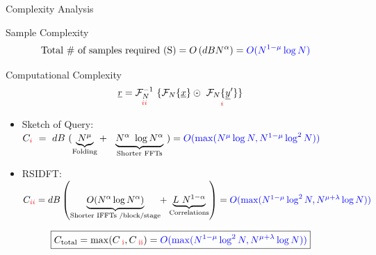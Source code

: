 \documentclass[10pt,xcolor=table]{beamer}
\newcommand{\xv}{\underline{x}}
\newcommand{\yv}{\underline{y}}
\newcommand{\rv}{\underline{r}}
\newcommand{\RNum}[1]{\uppercase\expandafter{\romannumeral #1\relax}}
\begin{document}
\begin{frame}{Complexity Analysis}
	\begin{block}{Sample Complexity}
		\vspace{-10pt}
		\begin{align*}
		\text{Total \# of samples required (S)} &= O \left(dBN^{\alpha}\right) =   {\color{blue}O(N^{1-\mu}\log N)}
		\end{align*}
	\end{block}
	\begin{block}{Computational Complexity}
		\begin{equation*}\label{eqn:Rxy_fourier}
		\rv = \underset{\color{red}  \RNum{2} } {\mathcal{F}_{N}^{-1}} \ \{   \mathcal{F}_{N}\{\xv\}  \odot \ \underset{\color{red}  \RNum{1}  }{ \mathcal{F}_{N}\{\yv'\}}  \}
		\end{equation*}
		\vspace{-10pt}

	\begin{itemize}
		\item {\color{blue}Sketch of Query:}\\ \vspace{5pt}
	 {\small $C_{\color{red}\RNum{1}} \ = \  dB ~
	 ( \underset{\text{Folding} }{\underbrace{N^{\mu}}} + \ \
	 \underset{\text{Shorter FFTs} }{\underbrace{N^{\alpha} \ \log N^{\alpha}}} \ )
	 =  {\color{blue} O(\max(N^{\mu}\log N,N^{1-\mu}\log^2 N)) }$}

		\item {\color{blue}RSIDFT:} \\	{\small$C_{\color{red} \RNum{2}} =  {d B}  \left (
			\underset{\text{Shorter IFFTs /block/stage} }{\underbrace{ O(N^{\alpha}  \log N^{\alpha})}} \hspace{-3pt}+ \underset{\text{Correlations} }{\underbrace{ L~N^{1-\alpha}}} \right ) = {\color{blue} O(\max(N^{1-\mu}\log^2 N ,N^{\mu+\lambda}\log N)) }$}
	\end{itemize}
	\vspace{10pt}	
	\[\boxed{C_{\text{total}} = \max(C_{\color{red} \text{ \RNum{1}}},C_{\color{red} \text{ \RNum{2}}}) = {\color{blue} O(\max(N^{1-\mu}\log^2 N ,N^{\mu+\lambda}\log N)) }}\]
		
	\end{block}
\end{frame}
\end{document}
